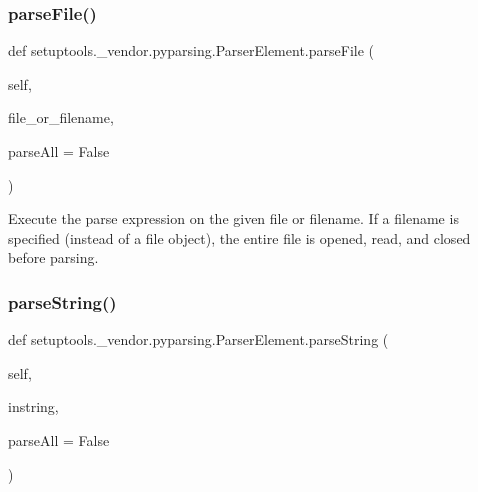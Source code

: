 \subsubsection{\texorpdfstring{parse\+File()}{parseFile()}}
{\footnotesize\ttfamily def setuptools.\+\_\+vendor.\+pyparsing.\+Parser\+Element.\+parse\+File (\begin{DoxyParamCaption}\item[{}]{self,  }\item[{}]{file\+\_\+or\+\_\+filename,  }\item[{}]{parse\+All = {\ttfamily False} }\end{DoxyParamCaption})}

\begin{DoxyVerb}Execute the parse expression on the given file or filename.
If a filename is specified (instead of a file object),
the entire file is opened, read, and closed before parsing.
\end{DoxyVerb}
 \mbox{\label{classsetuptools_1_1__vendor_1_1pyparsing_1_1_parser_element_aadaa0a9ab4b6dd77f5363812a6d8f314}} 
\subsubsection{\texorpdfstring{parse\+String()}{parseString()}}
{\footnotesize\ttfamily def setuptools.\+\_\+vendor.\+pyparsing.\+Parser\+Element.\+parse\+String (\begin{DoxyParamCaption}\item[{}]{self,  }\item[{}]{instring,  }\item[{}]{parse\+All = {\ttfamily False} }\end{DoxyParamCaption})}

